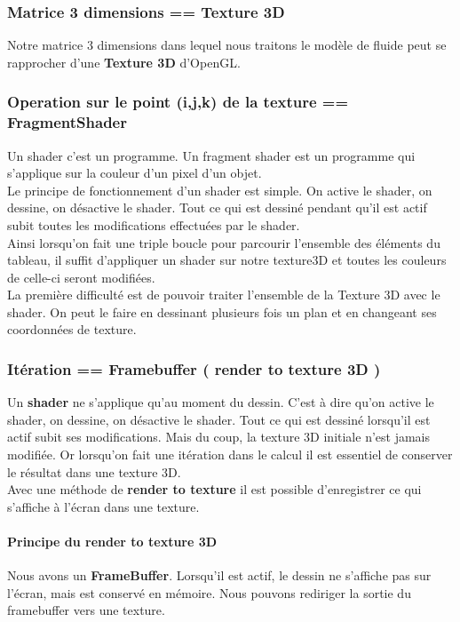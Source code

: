 \documentclass[a4paper,10pt]{article}
\begin{document}
\subsubsection{Matrice 3 dimensions == Texture 3D}
Notre matrice 3 dimensions dans lequel nous traitons le modèle de
fluide peut se rapprocher d'une \textbf{Texture 3D} d'OpenGL. \\

\subsubsection{Operation sur le point (i,j,k) de la texture == FragmentShader}
Un shader c'est un programme. Un fragment shader est un programme qui
s'applique sur la couleur d'un pixel d'un objet.\\ 

Le principe de fonctionnement d'un shader est simple. On active le
shader, on dessine, on désactive le shader. Tout ce qui est dessiné
pendant qu'il est actif subit toutes les modifications effectuées par
le shader.\\ 

Ainsi lorsqu'on fait une triple boucle pour parcourir l'ensemble des
éléments du tableau, il suffit d'appliquer un shader sur notre
texture3D et toutes les couleurs de celle-ci seront modifiées.\\

La première difficulté est de pouvoir traiter l'ensemble de la Texture
3D avec le shader. On peut le faire en dessinant plusieurs fois un
plan et en changeant ses coordonnées de texture.


\subsubsection{Itération == Framebuffer ( render to texture 3D ) }
Un \textbf{shader} ne s'applique qu'au moment du dessin.  C'est à dire
qu'on active le shader, on dessine, on désactive le shader. Tout ce
qui est dessiné lorsqu'il est actif subit ses modifications. Mais du
coup, la texture 3D initiale n'est jamais modifiée. Or lorsqu'on fait
une itération dans le calcul il est essentiel de conserver le résultat
dans une texture 3D.\\ 

Avec une méthode de \textbf{render to texture} il est possible
d'enregistrer ce qui s'affiche à l'écran dans une texture.\\

\paragraph*{Principe du render to texture 3D} Nous avons un
\textbf{FrameBuffer}. Lorsqu'il est actif, le dessin ne s'affiche pas
sur l'écran, mais est conservé en mémoire. Nous pouvons rediriger la
sortie du framebuffer vers une texture. \\ 
\end{document}
